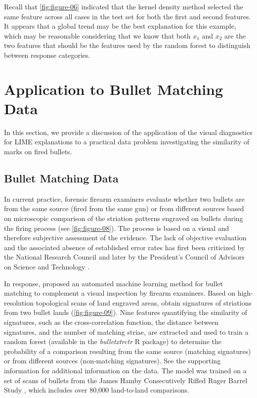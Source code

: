 \documentclass[AMS,STIX2COL]{WileyNJD-v2}\usepackage[]{graphicx}\usepackage[]{color}
\begin{document}
Recall that \autoref{fig:figure-06} indicated that the kernel density method selected the same feature across all cases in the test set for both the first and second features. It appears that a global trend may be the best explanation for this example, which may be reasonable considering that we know that both $x_1$ and $x_2$ are the two features that should be the features used by the random forest to distinguish between response categories.

\section{Application to Bullet Matching Data} \label{application}

In this section, we provide a discussion of the application of the visual diagnostics for LIME explanations to a practical data problem investigating the similarity of marks on fired bullets.

\subsection{Bullet Matching Data}





In current practice, forensic firearm examiners evaluate whether two bullets are from the same source (fired from the same gun) or from different sources based on microscopic comparison of the striation patterns engraved on bullets during the firing process (see \autoref{fig:figure-08}). The process is based on a visual and therefore subjective assessment of the evidence. The lack of objective evaluation and the associated absence of established error rates has first been criticized by the National Research Council \cite{nrc:2009} and later by the President's Council of Advisors on Science and Technology \cite{pcast:2016}.

In response, \citet{hare:2016} proposed an automated machine learning method for bullet matching to complement a visual inspection by firearm examiners. Based on high-resolution topological scans of land engraved areas, \citet{hare:2016} obtain signatures of striations from two bullet lands (\autoref{fig:figure-09}). Nine features quantifying the similarity of signatures, such as the cross-correlation function, the distance between signatures, and the number of matching striae, are extracted and used to train a random forest (available in the \emph{bulletxtrctr} R package) to determine the probability of a comparison resulting from the same source (matching signatures) or from different sources (non-matching signatures). See the supporting information for additional information on the data. The model was trained on a set of scans of bullets from the James Hamby Consecutively Rifled Ruger Barrel Study \citep{hamby:2009}, which includes over 80,000 land-to-land comparisons.
\end{document}
